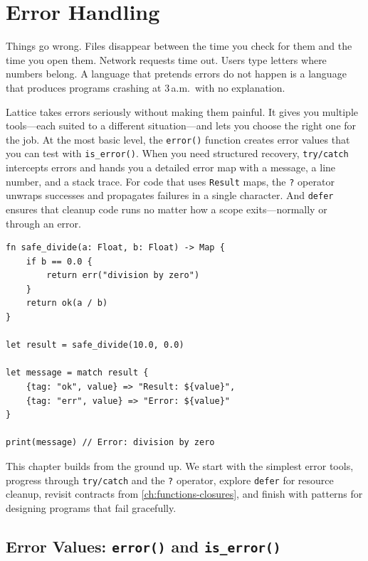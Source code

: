 \chapter{Error Handling}\label{ch:error-handling}


Things go wrong. Files disappear between the time you check for them and the time you open them. Network requests time out. Users type letters where numbers belong. A language that pretends errors do not happen is a language that produces programs crashing at 3\,a.m.\ with no explanation.

Lattice takes errors seriously without making them painful. It gives you multiple tools---each suited to a different situation---and lets you choose the right one for the job. At the most basic level, the \lstinline|error()| function creates error values that you can test with \lstinline|is_error()|. When you need structured recovery, \lstinline|try/catch| intercepts errors and hands you a detailed error map with a message, a line number, and a stack trace. For code that uses \lstinline|Result| maps, the \lstinline|?| operator unwraps successes and propagates failures in a single character. And \lstinline|defer| ensures that cleanup code runs no matter how a scope exits---normally or through an error.

\begin{lstlisting}[language=Lattice, caption={A quick tour of error handling}]
fn safe_divide(a: Float, b: Float) -> Map {
    if b == 0.0 {
        return err("division by zero")
    }
    return ok(a / b)
}

let result = safe_divide(10.0, 0.0)

let message = match result {
    {tag: "ok", value} => "Result: ${value}",
    {tag: "err", value} => "Error: ${value}"
}

print(message) // Error: division by zero
\end{lstlisting}

This chapter builds from the ground up. We start with the simplest error tools, progress through \lstinline|try/catch| and the \lstinline|?| operator, explore \lstinline|defer| for resource cleanup, revisit contracts from \cref{ch:functions-closures}, and finish with patterns for designing programs that fail gracefully.

\section{Error Values: \texttt{error()} and \texttt{is\_error()}}\label{sec:error-values}

